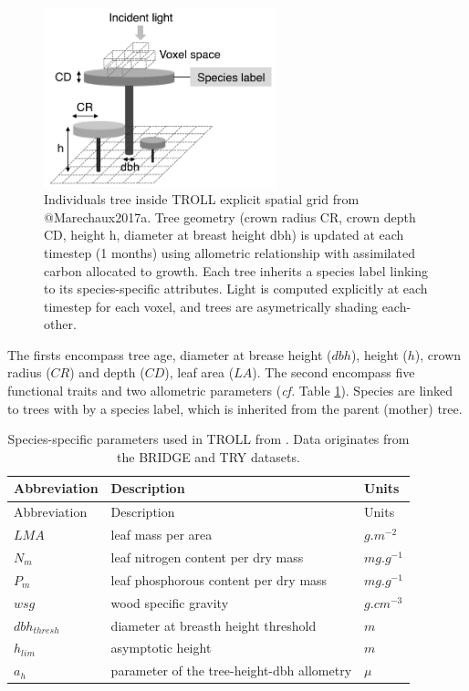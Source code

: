 \documentclass[12pt,]{article}
\theoremstyle{definition}
\theoremstyle{definition}
\theoremstyle{definition}
\theoremstyle{remark}
\begin{document}
\begin{figure}
\includegraphics[width=0.6\textwidth]{images/TROLLtree} \caption{Individuals tree inside TROLL explicit spatial grid from @Marechaux2017a. Tree geometry (crown radius CR, crown depth CD, height h, diameter at breast height dbh) is updated at each timestep (1 months) using allometric relationship with assimilated carbon allocated to growth. Each tree inherits a species label linking to its species-specific attributes. Light is computed explicitly at each timestep for each voxel, and trees are asymetrically shading each-other.}\label{fig:TROLLtree}
\end{figure}

The firsts encompass tree age, diameter at brease height (\(dbh\)),
height (\(h\)), crown radius (\(CR\)) and depth (\(CD\)), leaf area
(\(LA\)). The second encompass five functional traits and two allometric
parameters (\emph{cf.} Table \ref{tab:traits}). Species are linked to
trees with by a species label, which is inherited from the parent
(mother) tree.

\begin{longtable}[]{@{}lll@{}}
\caption{\label{tab:traits}Species-specific parameters used in TROLL from
\citet{Marechaux2017a}. Data originates from the BRIDGE
\citep{Baraloto2010} and TRY \citep{Kattge2011}
datasets.}\tabularnewline
\toprule
Abbreviation & Description & Units\tabularnewline
\midrule
\endfirsthead
\toprule
Abbreviation & Description & Units\tabularnewline
\midrule
\endhead
\(LMA\) & leaf mass per area & \(g.m^{-2}\)\tabularnewline
\(N_m\) & leaf nitrogen content per dry mass &
\(mg.g^{-1}\)\tabularnewline
\(P_m\) & leaf phosphorous content per dry mass &
\(mg.g^{-1}\)\tabularnewline
\(wsg\) & wood specific gravity & \(g.cm^{-3}\)\tabularnewline
\(dbh_{thresh}\) & diameter at breasth height threshold &
\(m\)\tabularnewline
\(h_{lim}\) & asymptotic height & \(m\)\tabularnewline
\(a_h\) & parameter of the tree-height-dbh allometry &
\(\mu\)\tabularnewline
\bottomrule
\end{longtable}
\end{document}
